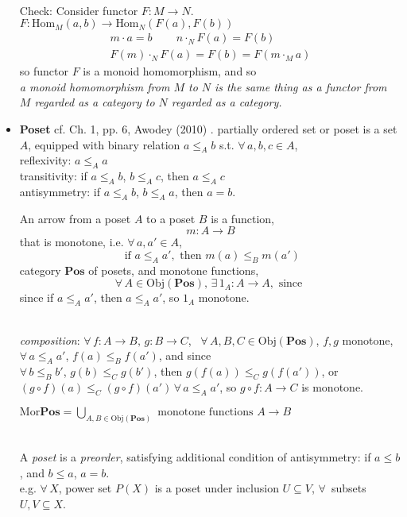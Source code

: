 \documentclass[10pt]{amsart}
\begin{document}
\begin{multicols*}{2}
\begin{itemize}
	\quad \\ 
	Check: Consider functor $F: M \to N$. \\
	$F: \text{Hom}_M(a,b) \to \text{Hom}_N(F(a), F(b))$
	\[
	\begin{gathered}
	m\cdot a =b \qquad \, n \cdot_N F(a)  = F(b) \\
	F(m) \cdot_N F(a) = F(b) = F(m \cdot_M a) 
	\end{gathered}
	\]
	so functor $F$ is a monoid homomorphism, and so \\
	\emph{a monoid homomorphism from $M$ to $N$ is the same thing as a functor from $M$ regarded as a category to $N$ regarded as a category.}
	\item \textbf{Poset} cf. Ch. 1, pp. 6, Awodey (2010) \cite{Awod2010}. partially ordered set or poset is a set $A$, equipped with binary relation $a \leq_A b$ s.t. $\forall \, a, b, c \in A$, \\
	reflexivity: $a \leq_A a$ \\
	transitivity: if $a\leq_A b$, $b\leq_A c$, then $a\leq_A  c$ \\
	antisymmetry: if $a\leq_A b$, $b\leq_A a$, then $a=b$.
	
	An arrow from a poset $A$ to a poset $B$ is a function,
	\[
	m : A \to B
	\]
that is monotone, i.e. $\forall \, a, a' \in A$, 
\[
\text{ if } a \leq_A a', \text{ then } m(a) \leq_B m(a')
\]	
category $\textbf{Pos}$ of posets, and monotone functions, 
\[
\forall \, A \in \text{Obj}(\textbf{Pos}), \, \exists \, 1_A : A \to A, \text{ since } 
\]
since if $a \leq_A a'$, then $a\leq_A a'$, so $1_A$ monotone.

\quad \\ 
\emph{composition}: $\forall \, f:A \to B, \, g:B \to C$, \, $\forall \, A,B,C \in \text{Obj}(\textbf{Pos})$, $f,g$ monotone, \\
$\forall \, a \leq_A a'$, $f(a) \leq_B f(a')$, and since \\
$\forall \, b \leq_B b'$, $g(b) \leq_C g(b')$, then $g(f(a)) \leq_C g(f(a'))$, or $(g\circ f)(a) \leq_C (g\circ f)(a') \, \forall \, a\leq_A a'$, so $g\circ f : A \to C$ is monotone.

$\text{Mor}\textbf{Pos} = \bigcup_{A, B \in \text{Obj}(\textbf{Pos}) } \text{ monotone functions $A \to B$ }$  

\quad \\ 
A \emph{poset} is a \emph{preorder}, satisfying additional condition of antisymmetry:
if $a\leq b$, and $b\leq a$, $a=b$. \\
e.g. $\forall \, X$, power set $P(X)$ is a poset under inclusion $U\subseteq V$, $\forall \, $ subsets $U,V \subseteq X$.


\end{itemize}
\end{multicols*}
\end{document}

